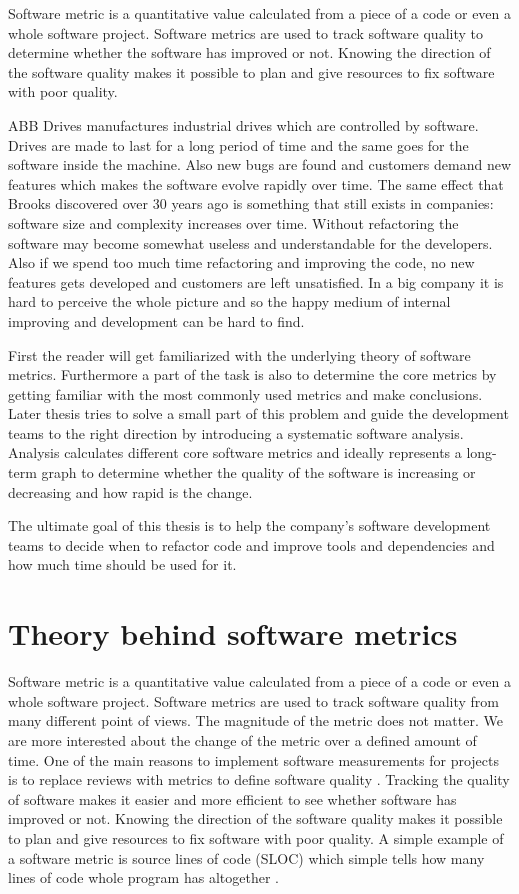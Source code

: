 Software metric is a quantitative value calculated from a piece of a code or even a whole software project. Software metrics are used to track software quality to determine whether the software has improved or not.  Knowing the direction of the software quality makes it possible to plan and give resources to fix software with poor quality.

ABB Drives manufactures industrial drives which are controlled by software. Drives are made to last for a long period of time and the same goes for the software inside the machine. Also new bugs are found and customers demand new features which makes the software evolve rapidly over time. The same effect that Brooks discovered over 30 years ago is something that still exists in companies: software size and complexity increases over time. Without refactoring the software may become somewhat useless and understandable for the developers. Also if we spend too much time refactoring and improving the code, no new features gets developed and customers are left unsatisfied. In a big company it is hard to perceive the whole picture and so the happy medium of internal improving and development can be hard to find.

First the reader will get familiarized with the underlying theory of software metrics. Furthermore a part of the task is also to determine the core metrics by getting familiar with the most commonly used metrics and make conclusions. Later thesis tries to solve a small part of this problem and guide the development teams to the right direction by introducing a systematic software analysis. Analysis calculates different core software metrics and ideally represents a long-term graph to determine whether the quality of the software is increasing or decreasing and how rapid is the change.

The ultimate goal of this thesis is to help the company’s software development teams to decide when to refactor code and improve tools and dependencies and how much time should be used for it.



\chapter{Theory behind software metrics}

Software metric is a quantitative value calculated from a piece of a code or even a whole software project. Software metrics are used to track software quality from many different point of views. The magnitude of the metric does not matter. We are more interested about the change of the metric over a defined amount of time. One of the main reasons to implement software measurements for projects is to replace reviews with metrics to define software quality \cite{sommerville2011software}. Tracking the quality of software makes it easier and more efficient to see whether software has improved or not. Knowing the direction of the software quality makes it possible to plan and give resources to fix software with poor quality. A simple example of a software metric is source lines of code (SLOC) which simple tells how many lines of code whole program has altogether \cite{nguyen2007sloc}.

